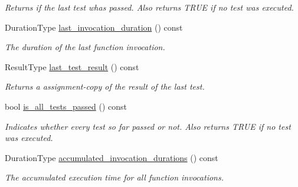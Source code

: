 \begin{DoxyCompactItemize}
\begin{DoxyCompactList}\small\item\em Returns if the last test whas passed. Also returns T\+R\+UE if no test was executed. \end{DoxyCompactList}\item 
Duration\+Type \hyperlink{classunittest_1_1_function_test_a51cf647d3cecad46510a90b488648227}{last\+\_\+invocation\+\_\+duration} () const \hypertarget{classunittest_1_1_function_test_a51cf647d3cecad46510a90b488648227}{}\label{classunittest_1_1_function_test_a51cf647d3cecad46510a90b488648227}

\begin{DoxyCompactList}\small\item\em The duration of the last function invocation. \end{DoxyCompactList}\item 
Result\+Type \hyperlink{classunittest_1_1_function_test_acd04aafd9cb3bb7ee22876e1e3979a11}{last\+\_\+test\+\_\+result} () const \hypertarget{classunittest_1_1_function_test_acd04aafd9cb3bb7ee22876e1e3979a11}{}\label{classunittest_1_1_function_test_acd04aafd9cb3bb7ee22876e1e3979a11}

\begin{DoxyCompactList}\small\item\em Returns a assignment-\/copy of the result of the last test. \end{DoxyCompactList}\item 
bool \hyperlink{classunittest_1_1_function_test_ac54d10d4dba64b9545ae7b2d30ae3d48}{is\+\_\+all\+\_\+tests\+\_\+passed} () const \hypertarget{classunittest_1_1_function_test_ac54d10d4dba64b9545ae7b2d30ae3d48}{}\label{classunittest_1_1_function_test_ac54d10d4dba64b9545ae7b2d30ae3d48}

\begin{DoxyCompactList}\small\item\em Indicates whether every test so far passed or not. Also returns T\+R\+UE if no test was executed. \end{DoxyCompactList}\item 
Duration\+Type \hyperlink{classunittest_1_1_function_test_a939a7d00636cae278f2b305f9cc9226f}{accumulated\+\_\+invocation\+\_\+durations} () const \hypertarget{classunittest_1_1_function_test_a939a7d00636cae278f2b305f9cc9226f}{}\label{classunittest_1_1_function_test_a939a7d00636cae278f2b305f9cc9226f}

\begin{DoxyCompactList}\small\item\em The accumulated execution time for all function invocations. \end{DoxyCompactList}\end{DoxyCompactItemize}
